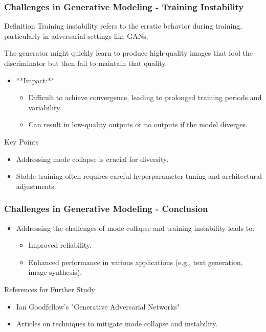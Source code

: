 \documentclass[aspectratio=169]{beamer}
\begin{document}
\begin{frame}[fragile]
    \frametitle{Challenges in Generative Modeling - Training Instability}
    \begin{block}{Definition}
        Training instability refers to the erratic behavior during training, particularly in adversarial settings like GANs.
    \end{block}
    
    \begin{example}\vspace{-0.5cm}
        The generator might quickly learn to produce high-quality images that fool the discriminator but then fail to maintain that quality.
    \end{example}
    
    \begin{itemize}
        \item **Impact:**
        \begin{itemize}
            \item Difficult to achieve convergence, leading to prolonged training periods and variability.
            \item Can result in low-quality outputs or no outputs if the model diverges.
        \end{itemize}
    \end{itemize}

    \begin{block}{Key Points}
        \begin{itemize}
            \item Addressing mode collapse is crucial for diversity.
            \item Stable training often requires careful hyperparameter tuning and architectural adjustments.
        \end{itemize}
    \end{block}
\end{frame}

\begin{frame}[fragile]
    \frametitle{Challenges in Generative Modeling - Conclusion}
    \begin{itemize}
        \item Addressing the challenges of mode collapse and training instability leads to:
        \begin{itemize}
            \item Improved reliability.
            \item Enhanced performance in various applications (e.g., text generation, image synthesis).
        \end{itemize}
    \end{itemize}
    
    \begin{block}{References for Further Study}
        \begin{itemize}
            \item Ian Goodfellow’s "Generative Adversarial Networks"
            \item Articles on techniques to mitigate mode collapse and instability.
        \end{itemize}
    \end{block}
\end{frame}
\end{document}
